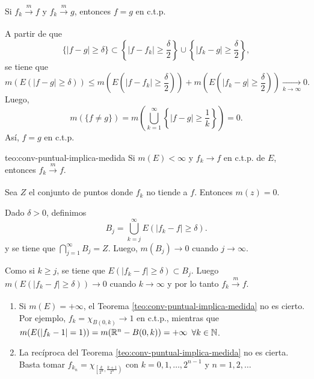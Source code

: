 \begin{teorema}{}
Si $f_k \xrightarrow[]{m}f$ y $f_k \xrightarrow[]{m} g$, entonces
$f=g$ en c.t.p.
\end{teorema}

\begin{demo}
A partir de que 
\[
\{|f-g|\geq \delta\} \subset 
\left\{|f-f_k|\geq\frac{\delta}{2}\right\} \cup \left\{|f_k-g|\geq\frac{\delta}{2}\right\}, 
\]
se tiene que 
\[
m\left(E\left(|f-g|\geq \delta\right)\right)\leq 
m\left(E\left(|f-f_k|\geq \frac{\delta}{2}\right)\right)+
m\left(E\left(|f_k-g|\geq \frac{\delta}{2}\right)\right) \xrightarrow[k \to \infty]{} 0.
\]
Luego, 
\[
m(\{f\neq g\})=
m\left( \bigcup\limits_{k=1}^{\infty} \left\{|f-g|\geq \frac{1}{k}  \right\} \right)=0.
\]
As\'i, $f=g$ en c.t.p.
\end{demo}


\begin{teorema}{teo:conv-puntual-implica-medida}
Si $m(E)<\infty$ y $f_k \to f$ en c.t.p. de $E$, entonces 
$f_k \xrightarrow[]{m}f$.
\end{teorema}


\begin{demo}
Sea $Z$ el conjunto de puntos donde $f_k$ no tiende a $f$. Entonces $m(z)=0$. 

Dado $\delta>0$, definimos 
\[
B_j=\bigcup\limits_{k=j}^{\infty} E(|f_k-f|\geq \delta).
\]
 y se tiene que $ \bigcap\limits_{j=1}^{\infty} B_j=Z.$
 Luego, $m(B_j)\to 0$ cuando $j \to \infty$.
 
 Como si $k \geq j$, se tiene que $E(|f_k-f|\geq \delta )\subset B_j$.
Luego $m(E(|f_k-f|\geq \delta))\to 0$ cuando $k \to \infty$
y por lo tanto $f_k \xrightarrow[]{m}f.$
\end{demo}

\begin{observacion}{}
\begin{enumerate}
    \item Si $m(E)=+\infty$, el Teorema \ref{teo:conv-puntual-implica-medida} no es cierto. 
    Por ejemplo,  $f_k=\chi_{B(0,k)} \to 1$ en c.t.p., mientras que 
    $m(E(|f_k-1|=1 ))=m(\mathbb{R}^n-B(0,k))= +\infty$\; $\forall k\in \mathbb{N}$.
    \item La rec\'iproca del Teorema \ref{teo:conv-puntual-implica-medida} no es cierta. 
    Basta tomar $f_{k_n}=\chi_{\left[\frac{k}{2^n}, \frac{k+1}{2^n}\right)}$ con 
    $k=0,1, \ldots, 2^{n-1}$ y $n=1,2,\ldots$
\end{enumerate}
\end{observacion}{}


